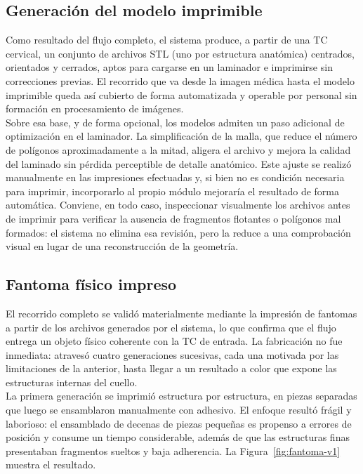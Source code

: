 \subsection{Generación del modelo imprimible}

Como resultado del flujo completo, el sistema produce, a partir de una TC cervical, un conjunto de archivos STL (uno por estructura anatómica) centrados, orientados y cerrados, aptos para cargarse en un laminador e imprimirse sin correcciones previas. El recorrido que va desde la imagen médica hasta el modelo imprimible queda así cubierto de forma automatizada y operable por personal sin formación en procesamiento de imágenes.\\

Sobre esa base, y de forma opcional, los modelos admiten un paso adicional de optimización en el laminador. La simplificación de la malla, que reduce el número de polígonos aproximadamente a la mitad, aligera el archivo y mejora la calidad del laminado sin pérdida perceptible de detalle anatómico. Este ajuste se realizó manualmente en las impresiones efectuadas y, si bien no es condición necesaria para imprimir, incorporarlo al propio módulo mejoraría el resultado de forma automática. Conviene, en todo caso, inspeccionar visualmente los archivos antes de imprimir para verificar la ausencia de fragmentos flotantes o polígonos mal formados: el sistema no elimina esa revisión, pero la reduce a una comprobación visual en lugar de una reconstrucción de la geometría.\\

\subsection{Fantoma físico impreso}
 
El recorrido completo se validó materialmente mediante la impresión de fantomas a partir de los archivos generados por el sistema, lo que confirma que el flujo entrega un objeto físico coherente con la TC de entrada. La fabricación no fue inmediata: atravesó cuatro generaciones sucesivas, cada una motivada por las limitaciones de la anterior, hasta llegar a un resultado a color que expone las estructuras internas del cuello.\\
 
La primera generación se imprimió estructura por estructura, en piezas separadas que luego se ensamblaron manualmente con adhesivo. El enfoque resultó frágil y laborioso: el ensamblado de decenas de piezas pequeñas es propenso a errores de posición y consume un tiempo considerable, además de que las estructuras finas presentaban fragmentos sueltos y baja adherencia. La Figura~\ref{fig:fantoma-v1} muestra el resultado.\\
 
